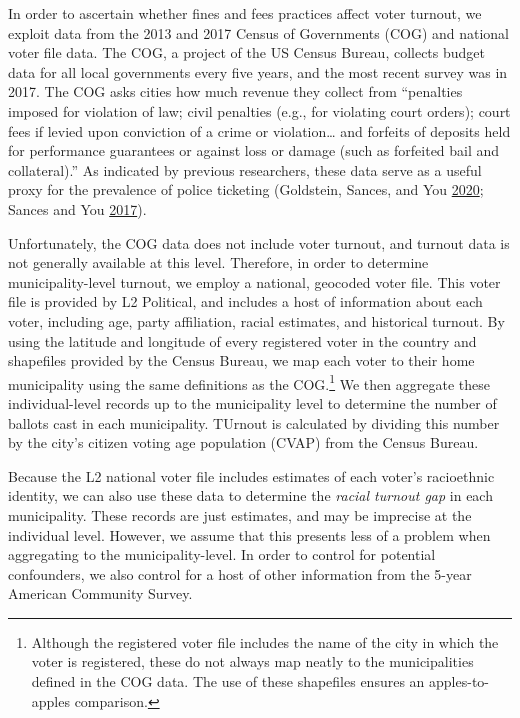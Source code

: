 \documentclass[
  12pt,
]{article}
\begin{document}
In order to ascertain whether fines and fees practices affect voter turnout, we exploit data from the 2013 and 2017 Census of Governments (COG) and national voter file data. The COG, a project of the US Census Bureau, collects budget data for all local governments every five years, and the most recent survey was in 2017. The COG asks cities how much revenue they collect from ``penalties imposed for violation of law; civil penalties (e.g., for violating court orders); court fees if levied upon conviction of a crime or violation\ldots{} and forfeits of deposits held for performance guarantees or against loss or damage (such as forfeited bail and collateral).'' As indicated by previous researchers, these data serve as a useful proxy for the prevalence of police ticketing (Goldstein, Sances, and You \protect\hyperlink{ref-Goldstein2020}{2020}; Sances and You \protect\hyperlink{ref-Sances2017}{2017}).

Unfortunately, the COG data does not include voter turnout, and turnout data is not generally available at this level. Therefore, in order to determine municipality-level turnout, we employ a national, geocoded voter file. This voter file is provided by L2 Political, and includes a host of information about each voter, including age, party affiliation, racial estimates, and historical turnout. By using the latitude and longitude of every registered voter in the country and shapefiles provided by the Census Bureau, we map each voter to their home municipality using the same definitions as the COG.\footnote{Although the registered voter file includes the name of the city in which the voter is registered, these do not always map neatly to the municipalities defined in the COG data. The use of these shapefiles ensures an apples-to-apples comparison.} We then aggregate these individual-level records up to the municipality level to determine the number of ballots cast in each municipality. TUrnout is calculated by dividing this number by the city's citizen voting age population (CVAP) from the Census Bureau.

Because the L2 national voter file includes estimates of each voter's racioethnic identity, we can also use these data to determine the \emph{racial turnout gap} in each municipality. These records are just estimates, and may be imprecise at the individual level. However, we assume that this presents less of a problem when aggregating to the municipality-level. In order to control for potential confounders, we also control for a host of other information from the 5-year American Community Survey.
\end{document}
